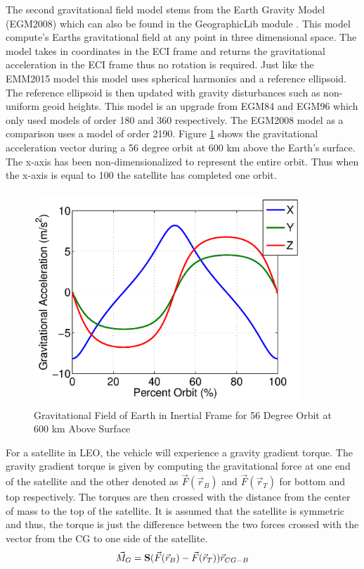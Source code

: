 \documentclass{article}
\begin{document}
The second gravitational field model stems from the
Earth Gravity Model (EGM2008) \cite{EGM2008} which can also be found
in the GeographicLib module \cite{GeographicLib}. This model compute's
Earths gravitational field at any point in three dimensional
space. The model takes in coordinates in the ECI frame and returns the
gravitational acceleration in the ECI frame thus no rotation is
required. Just like the EMM2015 model this model uses spherical
harmonics and a reference ellipsoid. The reference ellipsoid is then
updated with gravity disturbances such as non-uniform geoid
heights. This model is an upgrade from EGM84 and EGM96 which only
used models of order 180 and 360 respectively. The EGM2008 model as a
comparison uses a model of order 2190. Figure \ref{f:grav_orbit} shows
the gravitational acceleration vector during a 56 degree orbit at 600 km above the
Earth's surface. The x-axis has been non-dimensionalized to 
represent the entire orbit. Thus when the x-axis is equal to 100 the
satellite has completed one orbit.
\begin{figure}[H]
  \begin{center}
  \includegraphics[height=80mm, width=100mm]{Figures/Gravity_Field_Orbit}
  \end{center}
  \caption{Gravitational Field of Earth in Inertial Frame for 56 Degree
    Orbit at 600 km Above Surface}\label{f:grav_orbit}
\end{figure}

For a satellite in LEO, the vehicle will experience a gravity gradient
torque. The gravity gradient torque is given by computing the
gravitational force at one end of the satellite and the other denoted
as $\vec{F}(\vec{r}_B)$ and $\vec{F}(\vec{r}_T)$ for bottom and top
respectively. The torques are then crossed with the distance from the
center of mass to the top of the satellite. It is assumed that the
satellite is symmetric and thus, the torque is just the difference
between the two forces crossed with the vector from the CG to one side
of the satellite. 
\begin{equation}
    \vec{M}_G = {\bf S}(\vec{F}(\vec{r}_B)-\vec{F}(\vec{r}_T))\vec{r}_{CG-B}
\end{equation}
\end{document}

